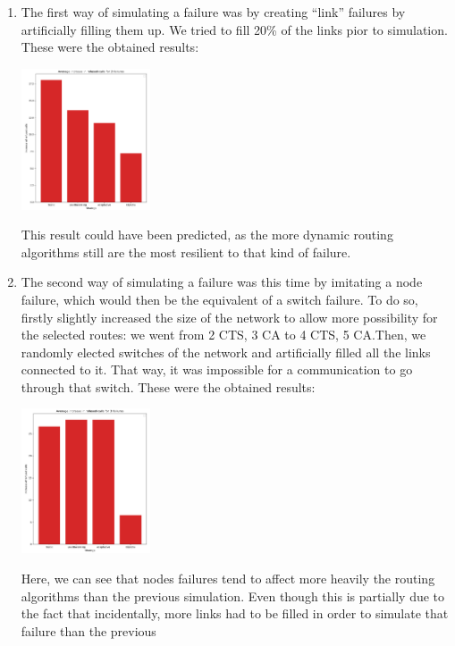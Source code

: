 \documentclass[lettersize,journal]{IEEEtran} %
\begin{document}
\begin{enumerate}
        \item The first way of simulating a failure was by creating ``link'' failures by artificially filling them up. We tried to fill
        20\% of the links pior to simulation. These were the obtained results:
        \begin{center}
                \includegraphics[width=0.3\textwidth]{images/link_failures_2.png}       
        \end{center}
        This result could have been predicted, as the more dynamic routing algorithms still are the most resilient to that kind of failure.
        \item The second way of simulating a failure was this time by imitating a node failure, which would then be the equivalent of a 
        switch failure. To do so, firstly slightly increased the size of the network to allow more possibility for the selected routes:
        we went from 2 CTS, 3 CA to 4 CTS, 5 CA.Then, we randomly elected switches of the network and artificially filled all the links
        connected to it. That way, it was impossible for a communication to go through that switch. These were the obtained results:
        \begin{center}
                \includegraphics[width=0.3\textwidth]{images/node_failures_2.png}       
        \end{center}
        Here, we can see that nodes failures tend to affect more heavily the routing algorithms than the previous simulation. Even though
        this is partially due to the fact that incidentally, more links had to be filled in order to simulate that failure than the previous

\end{enumerate}
\end{document}
